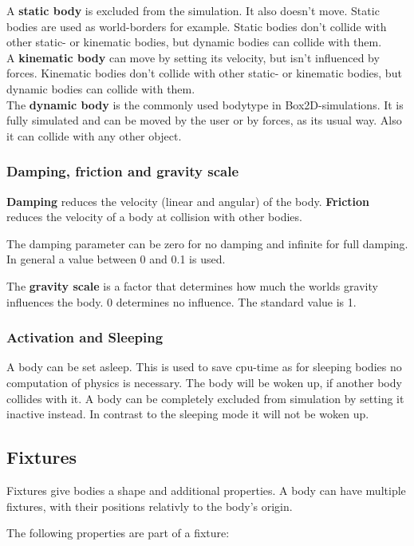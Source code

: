 \documentclass[10pt,a4paper,DIV=11]{scrreprt}
\begin{document}
A \textbf{static body} is excluded from the simulation. It also doesn't move. Static bodies are used as world-borders for example. Static bodies don't collide with other static- or kinematic bodies, but dynamic bodies can collide with them. \\

A \textbf{kinematic body} can move by setting its velocity, but isn't influenced by forces.
Kinematic bodies don't collide with other static- or kinematic bodies, but dynamic bodies can collide with them.\\

The \textbf{dynamic body} is the commonly used bodytype in Box2D-simulations. It is fully simulated and can be moved by the user or by forces, as its usual way. Also it can collide with any other object.

\subsubsection*{Damping, friction and gravity scale}
\textbf{Damping} reduces the velocity (linear and angular) of the body.
\textbf{Friction} reduces the velocity of a body at collision with other bodies.

The damping parameter can be zero for no damping and infinite for full damping. In general a value between 0 and 0.1 is used.

The \textbf{gravity scale} is a factor that determines how much the worlds gravity influences the body. 0 determines no influence. The standard value is 1.

\subsubsection*{Activation and Sleeping}
A body can be set asleep. This is used to save cpu-time as for sleeping bodies no computation of physics is necessary. The body will be woken up, if another body collides with it.
A body can be completely excluded from simulation by setting it inactive instead.
In contrast to the sleeping mode it will not be woken up.

\subsection{Fixtures}
Fixtures give bodies a shape and additional properties. A body can have multiple fixtures, with their positions relativly to the body's origin.

The following properties are part of a fixture:
\end{document}
